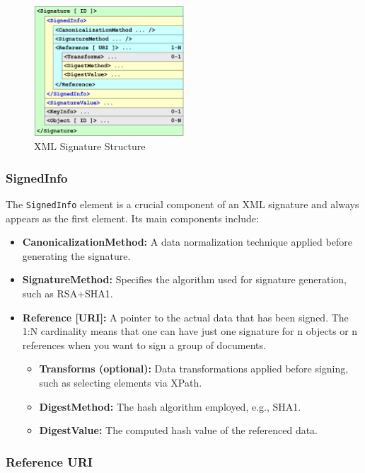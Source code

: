 \begin{figure}[H]
  \centering
  \includegraphics[width=0.5\textwidth]{img/xml signature structure.png}
  \caption{XML Signature Structure}
  \label{fig:xml signature structure}
\end{figure}

\subsubsection{SignedInfo}

The \texttt{SignedInfo} element is a crucial component of an XML
signature and always appears as the first element. Its main components
include:

\begin{itemize}
  \item \textbf{CanonicalizationMethod:} A data normalization
    technique applied before generating the signature.
  \item \textbf{SignatureMethod:} Specifies the algorithm used for
    signature generation, such as RSA+SHA1.
  \item \textbf{Reference [URI]:} A pointer to the actual data that
    has been signed. The 1:N cardinality means that one can have
    just one signature for n objects or n references when you want
    to sign a group of documents.
    \begin{itemize}
      \item \textbf{Transforms (optional):} Data transformations
        applied before signing, such as selecting elements via
        XPath.
      \item \textbf{DigestMethod:} The hash algorithm employed,
        e.g., SHA1.
      \item \textbf{DigestValue:} The computed hash value of the
        referenced data.
    \end{itemize}
\end{itemize}

\subsubsection{Reference URI}

